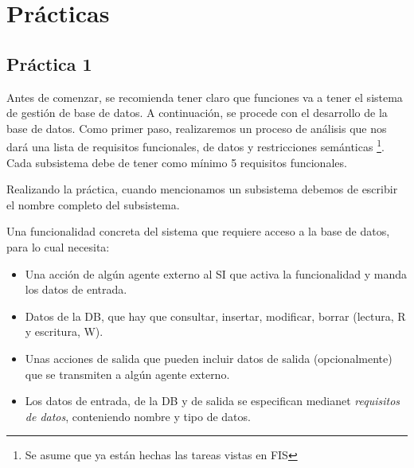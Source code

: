 \documentclass[12pt]{report} %
\begin{document}
\part{Prácticas}

\hypertarget{pruxe1ctica-1}{%
\chapter{Práctica 1}\label{pruxe1ctica-1}}

Antes de comenzar, se recomienda tener claro que funciones va a tener el
sistema de gestión de base de datos. A continuación, se procede con el
desarrollo de la base de datos. Como primer paso, realizaremos un
proceso de análisis que nos dará una lista de requisitos funcionales, de
datos y restricciones semánticas
\footnote{Se asume que ya están hechas las tareas vistas en FIS}. Cada
subsistema debe de tener como mínimo 5 requisitos funcionales.

Realizando la práctica, cuando mencionamos un subsistema debemos de
escribir el nombre completo del subsistema.

\begin{definicion}

    Una funcionalidad concreta del sistema que requiere acceso a la base de datos, para lo cual necesita:

    \begin{itemize}

    \item Una acción de algún agente externo al SI que activa la funcionalidad y manda los datos de entrada.
    \item Datos de la DB, que hay que consultar, insertar, modificar, borrar (lectura, R y escritura, W).
    \item Unas acciones de salida que pueden incluir datos de salida (opcionalmente) que se transmiten a algún agente externo.
    \item Los datos de entrada, de la DB y de salida se especifican medianet \textit{requisitos de datos}, conteniendo nombre y tipo de datos.

    \end{itemize}

\end{definicion}
\end{document}
